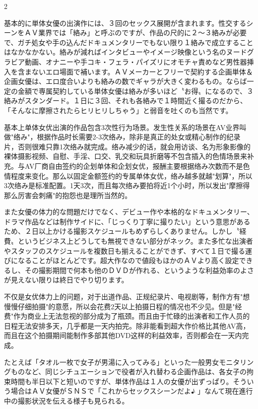 \documentclass[12pt,UTF8]{ctexbook}
\begin{document}
\begin{paracol}{2}
\switchcolumn*

基本的に単体女優の出演作には、３回のセックス展開が含まれます。性交するシーンをＡＶ業界では「絡み」と呼ぶのですが、作品の尺的に２〜３絡みが必要で、ガチ処女や手の込んだドキュメンタリーでもない限り１絡みで成立することはなかなかない。絡みが減ればインタビューやイメージ映像という名のヌードグラビア動画、オナニーや手コキ・フェラ・パイズリにオモチャ責めなど男性器挿入を含まないエロ場面で補います。ＡＶメーカーとフリーで契約する企画単体＆ 企画女優は、エロ度合いよりも絡みの数でギャラが大きく変わるもの。ならば一定の金額で専属契約している単体女優は絡みが多いほど〝お得〟になるので、３絡みがスタンダード。１日に３回、それも各絡みで１時間近く撮るのだから、「そんなに摩擦されたらヒリヒリしちゃう」と弱音を吐くのも当然です。

\switchcolumn

基本上单体女优出演的作品包含3次性行为场景。发生性关系的场景在AV业界叫做"络み"，根据作品时长需要2-3次络み，除非是真正的处女或精心制作的纪录片，否则很难只靠1次络み就完成。络み减少的话，就会用访谈、名为形象影像的裸体摄影视频、自慰、手淫、口交、乳交和玩具折磨等不包含插入的色情场景来补充。与AV厂商自由签约的企划单体和企划女优，报酬主要根据络み次数而不是色情程度来变化。那么以固定金额签约的专属单体女优，络み越多就越"划算"，所以3次络み是标准配置。1天3次，而且每次络み要拍将近1个小时，所以发出"摩擦得那么厉害会刺痛"的抱怨也是理所当然的。

\switchcolumn*

また女優の体力的な問題だけでなく、デビュー作や本格的なドキュメンタリー、ドラマ作品などは制作サイドに、「じっくり丁寧に撮りたい」という意思があるため、２日以上かける撮影スケジュールもめずらしくありません。しかし〝経費〟というビジネス上どうしても無視できない部分がネック。また多忙な出演者やスタッフのスケジュールを複数日も揃えることができず、すべて１日で撮る運びになることがほとんどです。超大作なので値段もほかのＡＶより高く設定できるし、その撮影期間で何本も他のＤＶＤが作れる、というような利益効率のよさが見えない限りは終日でやり切ります。

\switchcolumn

不仅是女优体力上的问题，对于出道作品、正规纪录片、电视剧等，制作方有"想慢慢仔细拍摄"的意愿，所以会花费2天以上拍摄日程的情况也不少见。但是"经费"作为商业上无法忽视的部分成为了瓶颈。而且由于忙碌的出演者和工作人员的日程无法安排多天，几乎都是一天内拍完。除非能看到超大作价格比其他AV高，而且在这个拍摄期间能制作多部其他DVD这样的利益效率，否则都会在一天内完成。

\switchcolumn*

たとえば「タオル一枚で女子が男湯に入ってみる」といった一般男女モニタリングものなど、同じシチュエーションで役者が入れ替わる企画作品は、各女子の拘束時間も半日以下と短いのですが、単体作品は１人の女優が出ずっぱり。そういう場合はＡＶ女優がＳＮＳで「これからセックスシーンだよ♪
 」なんて現在進行中の撮影状況を伝える様子も見られる。


\end{paracol}
\end{document}
